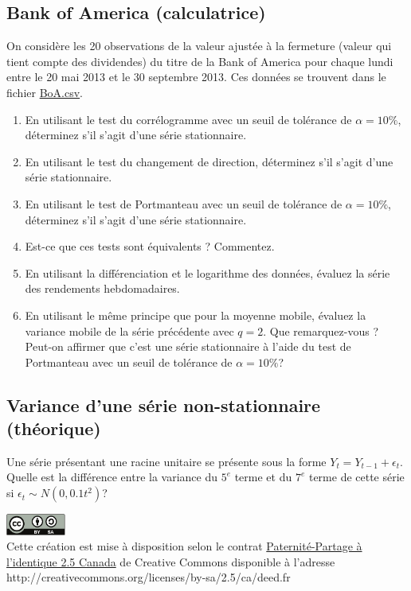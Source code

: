 \documentclass[11pt,english,francais]{article}
\begin{document}
\subsection{Bank of America (calculatrice)}

On considère les 20 observations de la valeur ajustée à la fermeture (valeur qui tient compte des dividendes) du titre de la Bank of America pour chaque lundi entre le 20 mai 2013 et le 30 septembre 2013. Ces données se trouvent dans le fichier \url{BoA.csv}.

\begin{enumerate}
\item En utilisant le test du corrélogramme avec un seuil de tolérance de $\alpha = 10\%$, déterminez s'il s'agit d'une série stationnaire.

\item En utilisant le test du changement de direction, déterminez s'il s'agit d'une série stationnaire.

\item En utilisant le test de Portmanteau avec un seuil de tolérance de $\alpha = 10\%$, déterminez s'il s'agit d'une série stationnaire.

\item Est-ce que ces tests sont équivalents ? Commentez.

\item En utilisant la différenciation et le logarithme des données, évaluez la série des rendements hebdomadaires.

\item En utilisant le même principe que pour la moyenne mobile, évaluez la variance mobile de la série précédente avec $q=2$. Que remarquez-vous ? Peut-on affirmer que c'est une série stationnaire à l'aide du test de Portmanteau avec  un seuil de tolérance de $\alpha = 10\%$?
\end{enumerate}

\subsection{Variance d'une série non-stationnaire (théorique)}
\label{sec:variance-dune-serie}

Une série présentant une racine unitaire se présente sous la forme $Y_t = Y_{t-1}+\epsilon_t$. Quelle est la différence entre la variance du $5^e$ terme et du $7^e$ terme de cette série si $\epsilon_t \sim N(0, 0.1t^2)$?

\clearpage

\includegraphics[height=7mm,keepaspectratio=true]{by-sa}\\%
Cette création est mise à disposition selon le contrat
\href{http://creativecommons.org/licenses/by-sa/2.5/ca/deed.fr}{%
  Paternité-Partage à l'identique 2.5 Canada} de Creative Commons
disponible à l'adresse \\
http://creativecommons.org/licenses/by-sa/2.5/ca/deed.fr \\
\end{document}
